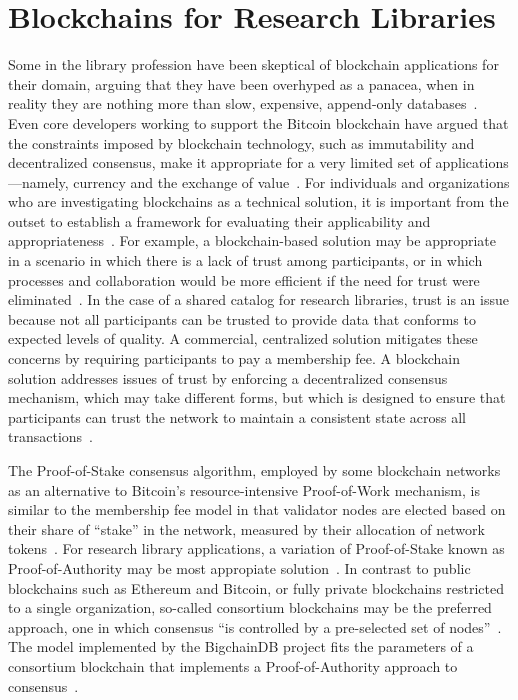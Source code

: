 \section{Blockchains for Research Libraries}
Some in the library profession have been skeptical of blockchain
applications for their domain, arguing that they have been overhyped as a
panacea, when in reality they are nothing more than slow, expensive,
append-only databases~\cite{sjsu18}. Even core developers working to support
the Bitcoin blockchain have argued that the constraints imposed by
blockchain technology, such as immutability and decentralized consensus,
make it appropriate for a very limited set of applications---namely,
currency and the exchange of value~\cite{jSong18}. For individuals and
organizations who are investigating blockchains as a technical solution, it
is important from the outset to establish a framework for evaluating their
applicability and appropriateness~\cite{bS28}. For example, a
blockchain-based solution may be appropriate in a scenario in which there is
a lack of trust among participants, or in which processes and collaboration
would be more efficient if the need for trust were eliminated~\cite{bS28}.
In the case of a shared catalog for research libraries, trust is an issue
because not all participants can be trusted to provide data that conforms to
expected levels of quality. A commercial, centralized solution mitigates
these concerns by requiring participants to pay a membership fee. A
blockchain solution addresses issues of trust by enforcing a decentralized
consensus mechanism, which may take different forms, but which is designed
to ensure that participants can trust the network to maintain a consistent
state across all transactions~\cite{buchman2018latest}.

The Proof-of-Stake consensus algorithm, employed by some blockchain
networks as an alternative to Bitcoin's resource-intensive Proof-of-Work
mechanism, is similar to the membership fee model in that validator nodes
are elected based on their share of ``stake'' in the network, measured by
their allocation of network tokens~\cite{gMarin18}. For research library
applications, a variation of Proof-of-Stake known as Proof-of-Authority may
be most appropiate solution~\cite{gMarin18, vButerin15}. In contrast to
public blockchains such as Ethereum and Bitcoin, or fully private
blockchains restricted to a single organization, so-called consortium
blockchains may be the preferred approach, one in which consensus ``is
controlled by a pre-selected set of nodes''~\cite{vButerin15}. The model
implemented by the BigchainDB project fits the parameters of a consortium
blockchain that implements a Proof-of-Authority approach to
consensus~\cite{bdb18b}.

